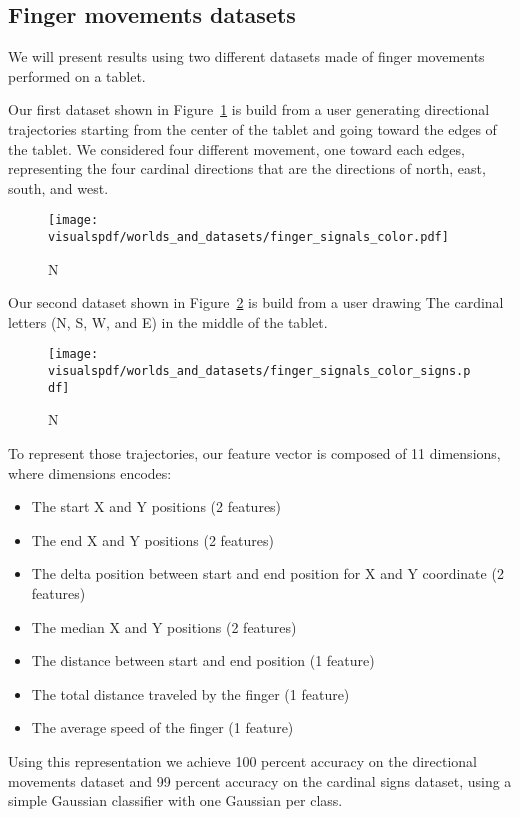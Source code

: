 \subsection{Finger movements datasets}

We will present results using two different datasets made of finger movements performed on a tablet. 

Our first dataset shown in Figure~\ref{fig:fingerdatasetdirection} is build from a user generating directional trajectories starting from the center of the tablet and going toward the edges of the tablet. We considered four different movement, one toward each edges, representing the four cardinal directions that are the directions of north, east, south, and west. 

\begin{figure}[!ht]
\centering
\texttt{[image: \\visualspdf/worlds\_and\_datasets/finger\_signals\_color.pdf]}
\caption{N}
\label{fig:fingerdatasetdirection}
\end{figure} 

Our second dataset shown in Figure~\ref{fig:fingerdatasetsigns} is build from a user drawing The cardinal letters (N, S, W, and E) in the middle of the tablet.

\begin{figure}[!ht]
\centering
\texttt{[image: \\visualspdf/worlds\_and\_datasets/finger\_signals\_color\_signs.pdf]}
\caption{N}
\label{fig:fingerdatasetsigns}
\end{figure} 

To represent those trajectories, our feature vector is composed of 11 dimensions, where dimensions encodes:
\begin{itemize}
   \item The start X and Y positions (2 features)
   \item The end X and Y positions (2 features)
   \item The delta position between start and end position for X and Y coordinate (2 features)
   \item The median X and Y positions (2 features)
   \item The distance between start and end position (1 feature)
   \item The total distance traveled by the finger (1 feature)
   \item The average speed of the finger (1 feature)
\end{itemize}

Using this representation we achieve 100 percent accuracy on the directional movements dataset and 99 percent accuracy on the cardinal signs dataset, using a simple Gaussian classifier with one Gaussian per class.

